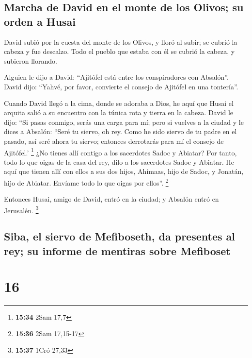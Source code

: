 \hypertarget{marcha-de-david-en-el-monte-de-los-olivos-su-orden-a-husai}{%
\subsection{Marcha de David en el monte de los Olivos; su orden a
Husai}\label{marcha-de-david-en-el-monte-de-los-olivos-su-orden-a-husai}}

 David subió por la cuesta del monte de los Olivos, y
lloró al subir; se cubrió la cabeza y fue descalzo. Todo el pueblo que
estaba con él se cubrió la cabeza, y subieron llorando.

 Alguien le dijo a David: ``Ajitófel está entre los
conspiradores con Absalón''. David dijo: ``Yahvé, por favor, convierte
el consejo de Ajitófel en una tontería''.

 Cuando David llegó a la cima, donde se adoraba a Dios,
he aquí que Husai el arquita salió a su encuentro con la túnica rota y
tierra en la cabeza.  David le dijo: ``Si pasas conmigo,
serás una carga para mí;  pero si vuelves a la ciudad y
le dices a Absalón: ``Seré tu siervo, oh rey. Como he sido siervo de tu
padre en el pasado, así seré ahora tu siervo; entonces derrotarás para
mí el consejo de Ajitófel.' \footnote{\textbf{15:34} 2Sam 17,7}
 ¿No tienes allí contigo a los sacerdotes Sadoc y
Abiatar? Por tanto, todo lo que oigas de la casa del rey, dilo a los
sacerdotes Sadoc y Abiatar.  He aquí que tienen allí con
ellos a sus dos hijos, Ahimaas, hijo de Sadoc, y Jonatán, hijo de
Abiatar. Envíame todo lo que oigas por ellos''. \footnote{\textbf{15:36}
  2Sam 17,15-17}

 Entonces Husai, amigo de David, entró en la ciudad; y
Absalón entró en Jerusalén. \footnote{\textbf{15:37} 1Cró 27,33}

\hypertarget{siba-el-siervo-de-mefiboseth-da-presentes-al-rey-su-informe-de-mentiras-sobre-mefiboset}{%
\subsection{Siba, el siervo de Mefiboseth, da presentes al rey; su
informe de mentiras sobre
Mefiboset}\label{siba-el-siervo-de-mefiboseth-da-presentes-al-rey-su-informe-de-mentiras-sobre-mefiboset}}

\hypertarget{section-15}{%
\section{16}\label{section-15}}

